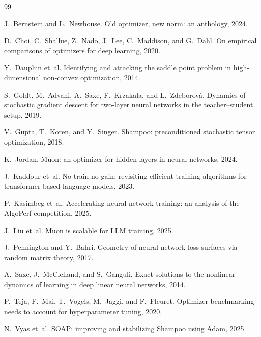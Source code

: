 \documentclass{article}
\begin{document}

\begin{thebibliography}{99}

J.~Bernstein and L.~Newhouse.
\newblock Old optimizer, new norm: an anthology, 2024.

D.~Choi, C.~Shallue, Z.~Nado, J.~Lee, C.~Maddison, and G.~Dahl.
\newblock On empirical comparisons of optimizers for deep learning, 2020.

Y.~Dauphin et~al.
\newblock Identifying and attacking the saddle point problem in
high-dimensional non-convex optimization, 2014.

S.~Goldt, M.~Advani, A.~Saxe, F.~Krzakala, and L.~Zdeborov\'a.
\newblock Dynamics of stochastic gradient descent for two-layer
neural networks in the teacher--student setup, 2019.

V.~Gupta, T.~Koren, and Y.~Singer.
\newblock Shampoo: preconditioned stochastic tensor optimization, 2018.

K.~Jordan.
\newblock Muon: an optimizer for hidden layers in neural networks, 2024.

J.~Kaddour et~al.
\newblock No train no gain: revisiting efficient training algorithms
for transformer-based language models, 2023.

P.~Kasimbeg et~al.
\newblock Accelerating neural network training: an analysis of the
AlgoPerf competition, 2025.

J.~Liu et~al.
\newblock Muon is scalable for LLM training, 2025.

J.~Pennington and Y.~Bahri.
\newblock Geometry of neural network loss surfaces via random
matrix theory, 2017.

A.~Saxe, J.~McClelland, and S.~Ganguli.
\newblock Exact solutions to the nonlinear dynamics of learning in
deep linear neural networks, 2014.

P.~Teja, F.~Mai, T.~Vogels, M.~Jaggi, and F.~Fleuret.
\newblock Optimizer benchmarking needs to account for hyperparameter
tuning, 2020.

N.~Vyas et~al.
\newblock SOAP: improving and stabilizing Shampoo using Adam, 2025.

\end{thebibliography}
\end{document}

